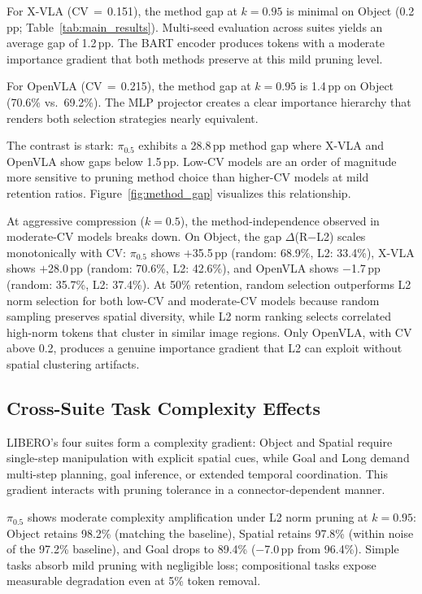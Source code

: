 For X-VLA (CV$\,{=}\,$0.151), the method gap at $k{=}0.95$ is minimal on Object (0.2\,pp; Table~\ref{tab:main_results}). Multi-seed evaluation across suites yields an average gap of 1.2\,pp. The BART encoder produces tokens with a moderate importance gradient that both methods preserve at this mild pruning level.

For OpenVLA (CV$\,{=}\,$0.215), the method gap at $k{=}0.95$ is 1.4\,pp on Object (70.6\% vs.\ 69.2\%). The MLP projector creates a clear importance hierarchy that renders both selection strategies nearly equivalent.

The contrast is stark: $\pi_0.5$ exhibits a 28.8\,pp method gap where X-VLA and OpenVLA show gaps below 1.5\,pp. Low-CV models are an order of magnitude more sensitive to pruning method choice than higher-CV models at mild retention ratios. Figure~\ref{fig:method_gap} visualizes this relationship.

At aggressive compression ($k{=}0.5$), the method-independence observed in moderate-CV models breaks down. On Object, the gap $\Delta$(R$-$L2) scales monotonically with CV: $\pi_0.5$ shows $+$35.5\,pp (random: 68.9\%, L2: 33.4\%), X-VLA shows $+$28.0\,pp (random: 70.6\%, L2: 42.6\%), and OpenVLA shows $-$1.7\,pp (random: 35.7\%, L2: 37.4\%). At 50\% retention, random selection outperforms L2 norm selection for both low-CV and moderate-CV models because random sampling preserves spatial diversity, while L2 norm ranking selects correlated high-norm tokens that cluster in similar image regions. Only OpenVLA, with CV above 0.2, produces a genuine importance gradient that L2 can exploit without spatial clustering artifacts.

\subsection{Cross-Suite Task Complexity Effects}
\label{sec:cross_suite}

LIBERO's four suites form a complexity gradient: Object and Spatial require single-step manipulation with explicit spatial cues, while Goal and Long demand multi-step planning, goal inference, or extended temporal coordination. This gradient interacts with pruning tolerance in a connector-dependent manner.

$\pi_0.5$ shows moderate complexity amplification under L2 norm pruning at $k{=}0.95$: Object retains 98.2\% (matching the baseline), Spatial retains 97.8\% (within noise of the 97.2\% baseline), and Goal drops to 89.4\% ($-$7.0\,pp from 96.4\%). Simple tasks absorb mild pruning with negligible loss; compositional tasks expose measurable degradation even at 5\% token removal.

